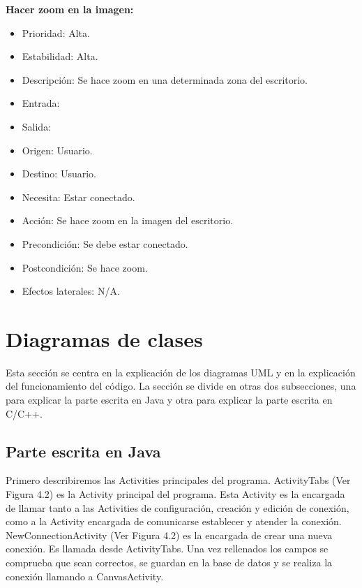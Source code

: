 \textbf{Hacer zoom en la imagen:}
\begin{itemize}
\item Prioridad: Alta.
\item Estabilidad: Alta.
\item Descripción: Se hace zoom en una determinada zona del escritorio.
\item Entrada:
\item Salida:
\item Origen: Usuario.
\item Destino: Usuario.
\item Necesita: Estar conectado.
\item Acción: Se hace zoom en la imagen del escritorio.
\item Precondición: Se debe estar conectado.
\item Postcondición: Se hace zoom.
\item Efectos laterales: N/A.\\

\end{itemize}
\newpage
\section {Diagramas de clases}

Esta sección se centra en la explicación de los diagramas UML y en la explicación del funcionamiento del código. La sección se divide en otras dos subsecciones, una para explicar la parte escrita en Java y otra para explicar la parte escrita en C/C++.

\subsection{Parte escrita en Java}

Primero describiremos las Activities principales del programa. ActivityTabs (Ver Figura 4.2) es la Activity principal del programa. Esta Activity es la encargada de llamar tanto a las Activities de configuración, creación y edición de conexión, como a la Activity encargada de comunicarse establecer y atender la conexión.\\

NewConnectionActivity (Ver Figura 4.2) es la encargada de crear una nueva conexión. Es llamada desde ActivityTabs. Una vez rellenados los campos se comprueba que sean correctos, se guardan en la base de datos y se realiza la conexión llamando a CanvasActivity.\\

